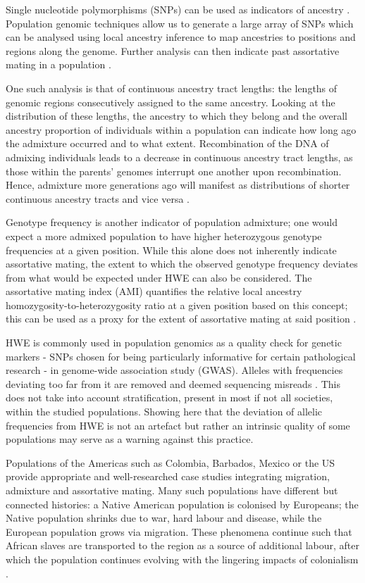 \documentclass[11pt]{article}
\begin{document}
Single nucleotide polymorphisms (SNPs) can be used as indicators of ancestry \parencite{Risch2009}. Population genomic techniques allow us to generate a large array of SNPs which can be analysed using local ancestry inference to map ancestries to positions and regions along the genome. Further analysis can then indicate past assortative mating in a population \parencite{Schubert2020}.

One such analysis is that of continuous ancestry tract lengths: the lengths of genomic regions consecutively assigned to the same ancestry. Looking at the distribution of these lengths, the ancestry to which they belong and the overall ancestry proportion of individuals within a population can indicate how long ago the admixture occurred and to what extent. Recombination of the DNA of admixing individuals leads to a decrease in continuous ancestry tract lengths, as those within the parents' genomes interrupt one another upon recombination. Hence, admixture more generations ago will manifest as distributions of shorter continuous ancestry tracts and vice versa \parencite{Gravel2012}. 

Genotype frequency is another indicator of population admixture; one would expect a more admixed population to have higher heterozygous genotype frequencies at a given position. While this alone does not inherently indicate assortative mating, the extent to which the observed genotype frequency deviates from what would be expected under HWE can also be considered. The assortative mating index (AMI) quantifies the relative local ancestry homozygosity-to-heterozygosity ratio at a given position based on this concept;  this can be used as a proxy for the extent of assortative mating at said position \parencite{Norris2019}.

HWE is commonly used in population genomics as a quality check for genetic markers - SNPs chosen for being particularly informative for certain pathological research - in genome-wide association study (GWAS). Alleles with frequencies deviating too far from it are removed and deemed sequencing misreads \parencite{Linares-Pineda2012}. This does not take into account stratification, present in most if not all societies, within the studied populations. Showing here that the deviation of allelic frequencies from HWE is not an artefact but rather an intrinsic quality of some populations may serve as a warning against this practice.

Populations of the Americas such as Colombia, Barbados, Mexico or the US provide appropriate and well-researched case studies integrating migration, admixture and assortative mating. Many such populations have different but connected histories: a Native American population is colonised by Europeans; the Native population shrinks due to war, hard labour and disease, while the European population grows via migration. These phenomena continue such that African slaves are transported to the region as a source of additional labour, after which the population continues evolving with the lingering impacts of colonialism \parencite{Bryc2010,Mas-Sandoval2019,ESilva2020}. 
\end{document}
